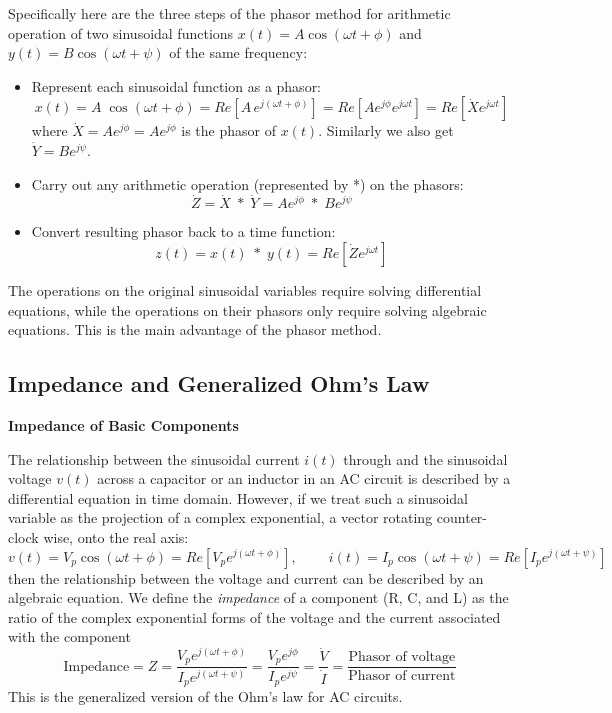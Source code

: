 Specifically here are the three steps of the phasor method for arithmetic 
operation of two sinusoidal functions $x(t)=A\cos(\omega t+\phi)$ and 
$y(t)=B\cos(\omega t+\psi)$ of the same frequency:
\begin{itemize}
\item Represent each sinusoidal function as a phasor:
  \[ x(t)=A\;\cos(\omega t+\phi)=Re[A\,e^{j(\omega t+\phi)}]
  =Re[A e^{j\phi} e^{j\omega t}] =Re[\dot{X} e^{j\omega t}] 
  \]
  where $\dot{X}=A e^{j\phi}=A e^{j\phi}$ is the phasor of $x(t)$. 
  Similarly we also get $\dot{Y}=B e^{j\psi}$.
\item Carry out any arithmetic operation (represented by *) on the phasors:
  \[ \dot{Z}=\dot{X}\;*\;\dot{Y}=A e^{j\phi} \;*\; B e^{j\psi} \]
\item Convert resulting phasor back to a time function:
  \[ z(t)=x(t)\;*\;y(t)=Re[\dot{Z} e^{j\omega t}]  \]
\end{itemize}


The operations on the original sinusoidal variables require solving 
differential equations, while the operations on their phasors only require 
solving algebraic equations. This is the main advantage of the phasor method.



\subsection{Impedance and Generalized Ohm's Law}

{\bf Impedance of Basic Components}

The relationship between the sinusoidal current $i(t)$ through and 
the sinusoidal voltage $v(t)$ across a capacitor or an inductor in 
an AC circuit is described by a differential equation in time domain.
However, if we treat such a sinusoidal variable as the projection of 
a complex exponential, a vector rotating counter-clock wise, onto the 
real axis:
\[
v(t)=V_p\cos(\omega t+\phi)=Re[ V_p e^{j(\omega t+\phi)} ],
\;\;\;\;\;\;\;\;
i(t)=I_p\cos(\omega t+\psi)=Re[ I_p e^{j(\omega t+\psi)} ]
\]
then the relationship between the voltage and current can be 
described by an algebraic equation. We define the {\em impedance} 
of a component (R, C, and L) as the ratio of the complex exponential
forms of the voltage and the current associated with the component
\[
\mbox{Impedance}=Z=\frac{V_pe^{j(\omega t+\phi)}}{I_pe^{j(\omega t+\psi)}}
  =\frac{V_pe^{j\phi}}{I_pe^{j\psi}}=\frac{\dot{V}}{\dot{I}}
  =\frac{\mbox{Phasor of voltage}}{\mbox{Phasor of current}}
\]
This is the generalized version of the Ohm's law for AC circuits.

